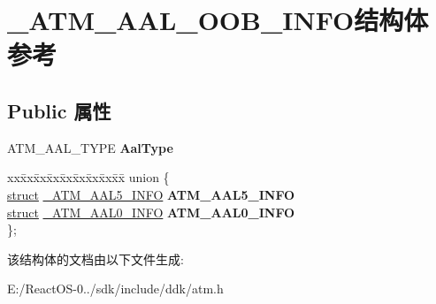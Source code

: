 \hypertarget{struct___a_t_m___a_a_l___o_o_b___i_n_f_o}{}\section{\+\_\+\+A\+T\+M\+\_\+\+A\+A\+L\+\_\+\+O\+O\+B\+\_\+\+I\+N\+F\+O结构体 参考}
\label{struct___a_t_m___a_a_l___o_o_b___i_n_f_o}
\subsection*{Public 属性}
\begin{DoxyCompactItemize}
\item 
\mbox{\label{struct___a_t_m___a_a_l___o_o_b___i_n_f_o_aa9b2e68e98f095ddb98d4f98cf3c3839}} 
A\+T\+M\+\_\+\+A\+A\+L\+\_\+\+T\+Y\+PE {\bfseries Aal\+Type}
\item 
\mbox{\label{struct___a_t_m___a_a_l___o_o_b___i_n_f_o_adba036d40a161029f58c8a736ae22940}} 
\begin{tabbing}
xx\=xx\=xx\=xx\=xx\=xx\=xx\=xx\=xx\=\kill
union \{\\
\>\hyperlink{interfacestruct}{struct} \hyperlink{struct___a_t_m___a_a_l5___i_n_f_o}{\_ATM\_AAL5\_INFO} {\bfseries ATM\_AAL5\_INFO}\\
\>\hyperlink{interfacestruct}{struct} \hyperlink{struct___a_t_m___a_a_l0___i_n_f_o}{\_ATM\_AAL0\_INFO} {\bfseries ATM\_AAL0\_INFO}\\
\}; \\

\end{tabbing}\end{DoxyCompactItemize}


该结构体的文档由以下文件生成\+:\begin{DoxyCompactItemize}
\item 
E\+:/\+React\+O\+S-\/0../sdk/include/ddk/atm.\+h\end{DoxyCompactItemize}
